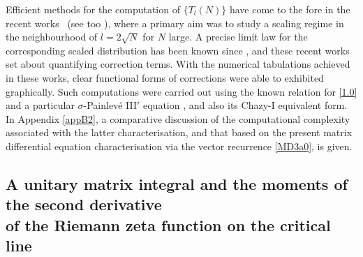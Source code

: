 \documentclass[pdftex]{sigma}
\numberwithin{equation}{section}
\theoremstyle{definition}
\begin{document}
Efficient methods for the computation of $\{T_l(N)\}$ have come to the fore in the recent works~\cite{Bo24,FM23} (see too \cite{Bo24a}), where a primary aim was to study a scaling regime in the neighbourhood of $l=2 \sqrt{N}$ for $N$ large. A precise limit law for the corresponding scaled distribution has been known since \cite{BDJ99}, and these recent works set about quantifying correction terms. With the numerical tabulations achieved in these works, clear functional forms of corrections were able to exhibited graphically.
Such computations were carried out using the known relation for
\eqref{1.0} and a particular
$\sigma$-Painlev\'e
III$'$ equation \cite{FW02,TW94b}, and also its Chazy-I equivalent form.
In Appendix \ref{appB2}, a comparative discussion of the computational complexity associated with the latter characterisation,
and that based on the present matrix differential equation characterisation via the vector recurrence \eqref{MD3a0}, is given.

\subsection[A unitary matrix integral and the moments of the second derivative of the Riemann zeta function on the critical line]{A unitary matrix integral and the moments of the second derivative\\ of the Riemann zeta function on the critical line}
\end{document}

